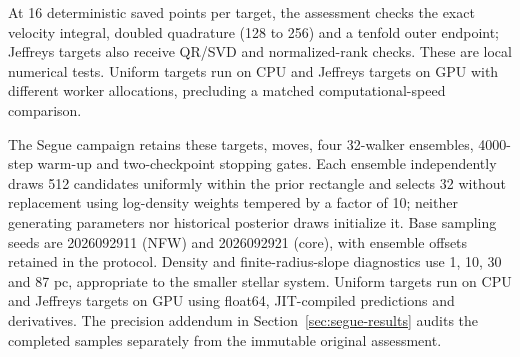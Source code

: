 At 16 deterministic saved points per target, the assessment checks the exact velocity integral, doubled quadrature (128 to 256) and a tenfold outer endpoint; Jeffreys targets also receive QR/SVD and normalized-rank checks. These are local numerical tests. Uniform targets run on CPU and Jeffreys targets on GPU with different worker allocations, precluding a matched computational-speed comparison.

The Segue campaign retains these targets, moves, four 32-walker ensembles, 4000-step warm-up and two-checkpoint stopping gates. Each ensemble independently draws 512 candidates uniformly within the prior rectangle and selects 32 without replacement using log-density weights tempered by a factor of 10; neither generating parameters nor historical posterior draws initialize it. Base sampling seeds are 2026092911 (NFW) and 2026092921 (core), with ensemble offsets retained in the protocol. Density and finite-radius-slope diagnostics use 1, 10, 30 and 87 pc, appropriate to the smaller stellar system. Uniform targets run on CPU and Jeffreys targets on GPU using float64, JIT-compiled predictions and derivatives. The precision addendum in Section~\ref{sec:segue-results} audits the completed samples separately from the immutable original assessment.
